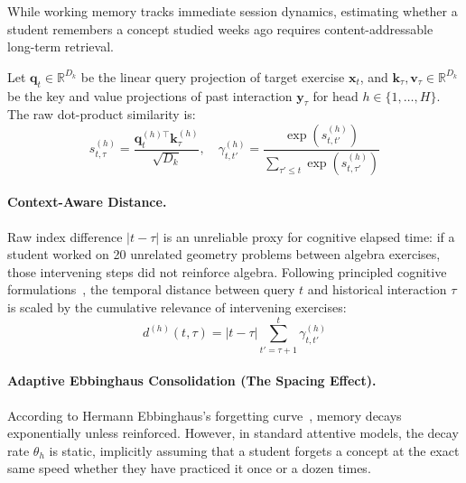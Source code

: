 \documentclass[11pt]{article}
\begin{document}
While working memory tracks immediate session dynamics, estimating whether a student remembers a concept studied weeks ago requires content-addressable long-term retrieval.

Let $\mathbf{q}_t \in \mathbb{R}^{D_k}$ be the linear query projection of target exercise $\mathbf{x}_t$, and $\mathbf{k}_\tau, \mathbf{v}_\tau \in \mathbb{R}^{D_k}$ be the key and value projections of past interaction $\mathbf{y}_\tau$ for head $h \in \{1, \dots, H\}$. The raw dot-product similarity is:
\begin{equation}
s_{t, \tau}^{(h)} = \frac{\mathbf{q}_t^{(h)\top} \mathbf{k}_\tau^{(h)}}{\sqrt{D_k}}, \quad \gamma_{t, t'}^{(h)} = \frac{\exp(s_{t, t'}^{(h)})}{\sum_{\tau' \le t} \exp(s_{t, \tau'}^{(h)})}
\end{equation}

\paragraph{Context-Aware Distance.}
Raw index difference $|t - \tau|$ is an unreliable proxy for cognitive elapsed time: if a student worked on 20 unrelated geometry problems between algebra exercises, those intervening steps did not reinforce algebra. Following principled cognitive formulations~\citep{ghosh2020context}, the temporal distance between query $t$ and historical interaction $\tau$ is scaled by the cumulative relevance of intervening exercises:
\begin{equation}
d^{(h)}(t, \tau) = |t - \tau| \sum_{t' = \tau + 1}^t \gamma_{t, t'}^{(h)}
\end{equation}

\paragraph{Adaptive Ebbinghaus Consolidation (The Spacing Effect).}
According to Hermann Ebbinghaus's forgetting curve~\citep{ebbinghaus1885memory}, memory decays exponentially unless reinforced. However, in standard attentive models, the decay rate $\theta_h$ is static, implicitly assuming that a student forgets a concept at the exact same speed whether they have practiced it once or a dozen times.
\end{document}
